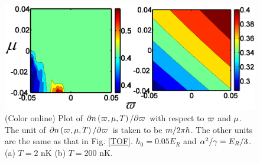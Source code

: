 \documentclass[pra,twocolumn,showpacs,floatfix]{revtex4-1}
\begin{document}
\begin{figure}[t]
\includegraphics[width=1.0\linewidth]{nder.eps} \vspace{-5pt} \vspace{-10pt}
\caption{(Color online) Plot of $\partial n\left( \protect\varpi ,\protect%
\mu ,T\right) /\partial \protect\varpi $ with respect to $\protect\varpi $
and $\protect\mu $. The unit of $\partial n\left( \protect\varpi ,\protect%
\mu ,T\right) /\partial \protect\varpi $ is taken to be $m/2\protect\pi %
\hbar $. The other units are the same as that in Fig. \protect\ref{TOF}. $%
h_{0}=0.05E_{R}$ and $\protect\alpha ^{2}/\protect\gamma =E_{R}/3$. (a) $T=2$
nK (b) $T=200$ nK.}
\label{fig:nder}
\end{figure}
\end{document}
